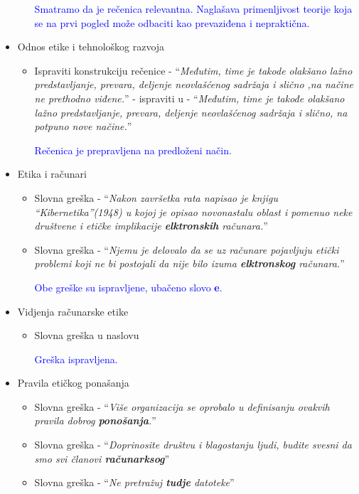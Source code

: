 \documentclass[a4paper]{report}
\newcommand{\odgovor}[1]{\textcolor{blue}{#1}}
\begin{document}
\begin{itemize}
\begin{itemize}
        \odgovor{Smatramo da je rečenica relevantna. Naglašava primenljivost teorije koja se na prvi pogled može odbaciti kao prevaziđena i nepraktična. }
    \end{itemize}
    \item Odnos etike i tehnološkog razvoja
    \begin{itemize}
        \item Ispraviti konstrukciju rečenice - ``\textit{Međutim, time je takode olakšano lažno predstavljanje, prevara, deljenje neovlašćenog sadržaja i slično ,na načine ne
prethodno viđene.}'' - ispraviti u - 
``\textit{Međutim, time je takođe olakšano lažno predstavljanje, prevara, deljenje neovlašćenog sadržaja i slično, na potpuno nove načine.}''

\odgovor{Rečenica je prepravljena na predloženi način.}

    \end{itemize}
    \item Etika i računari
    \begin{itemize}
        \item Slovna greška - ``\textit{Nakon završetka rata napisao je knjigu “Kibernetika”(1948) u kojoj je opisao novonastalu oblast i pomenuo neke društvene
i etičke implikacije \textbf{elktronskih} računara.}''
        \item Slovna greška - ``\textit{Njemu je delovalo da se uz računare pojavljuju etički problemi koji ne bi postojali da nije bilo izuma \textbf{elktronskog}
računara.}''

\odgovor{Obe greške su ispravljene, ubačeno slovo \textbf{e}.}

    \end{itemize}
    \item Vidjenja računarske etike
    \begin{itemize}
        \item Slovna greška u naslovu
        
        \odgovor{Greška ispravljena.}
        
    \end{itemize}
    \item Pravila etičkog ponašanja
    \begin{itemize}
        \item Slovna greška - ``\textit{Više organizacija se oprobalo u definisanju ovakvih pravila dobrog
\textbf{ponošanja}.}''
        \item Slovna greška - ``\textit{Doprinosite društvu i blagostanju ljudi, budite svesni da
smo svi članovi \textbf{računarksog}}''
        \item Slovna greška - ``\textit{Ne pretražuj \textbf{tudje} datoteke}''
        

\end{itemize}
\end{itemize}
\end{document}

